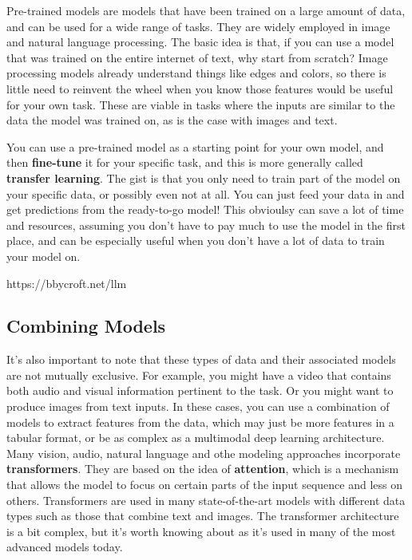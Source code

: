 \documentclass[
  letterpaper,
]{krantz}
\begin{document}
Pre-trained models are models that have been trained on a large amount
of data, and can be used for a wide range of tasks. They are widely
employed in image and natural language processing. The basic idea is
that, if you can use a model that was trained on the entire internet of
text, why start from scratch? Image processing models already understand
things like edges and colors, so there is little need to reinvent the
wheel when you know those features would be useful for your own task.
These are viable in tasks where the inputs are similar to the data the
model was trained on, as is the case with images and text.

You can use a pre-trained model as a starting point for your own model,
and then \textbf{fine-tune} it for your specific task, and this is more
generally called \textbf{transfer learning}. The gist is that you only
need to train part of the model on your specific data, or possibly even
not at all. You can just feed your data in and get predictions from the
ready-to-go model! This obvioulsy can save a lot of time and resources,
assuming you don't have to pay much to use the model in the first place,
and can be especially useful when you don't have a lot of data to train
your model on.

https://bbycroft.net/llm

\subsection{Combining Models}\label{combining-models}

It's also important to note that these types of data and their
associated models are not mutually exclusive. For example, you might
have a video that contains both audio and visual information pertinent
to the task. Or you might want to produce images from text inputs. In
these cases, you can use a combination of models to extract features
from the data, which may just be more features in a tabular format, or
be as complex as a multimodal deep learning architecture. Many vision,
audio, natural language and othe modeling approaches incorporate
\textbf{transformers}. They are based on the idea of \textbf{attention},
which is a mechanism that allows the model to focus on certain parts of
the input sequence and less on others. Transformers are used in many
state-of-the-art models with different data types such as those that
combine text and images. The transformer architecture is a bit complex,
but it's worth knowing about as it's used in many of the most advanced
models today.
\end{document}
